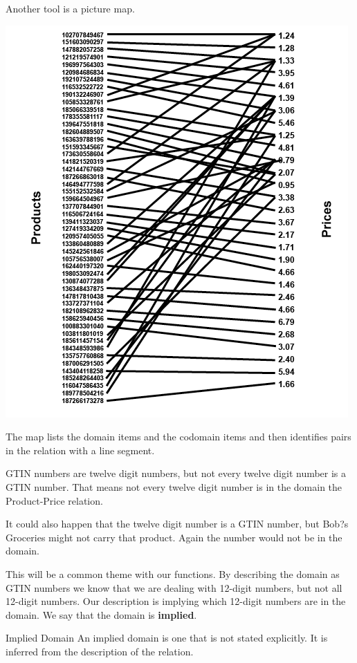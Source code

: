 \documentclass{ximera}
\begin{document}
Another tool is a picture map.
\begin{image}
\includegraphics{pics/Product_Price_Map.png}
\end{image}

The map lists the domain items and the codomain items and then identifies pairs in the relation with a line segment.



GTIN numbers are twelve digit numbers, but not every twelve digit number is a GTIN number. That means not every twelve digit number is in the domain the Product-Price relation.

It could also happen that the twelve digit number is a GTIN number, but Bob?s Groceries might not carry that product.  Again the number would not be in the domain.

This will be a common theme with our functions. By describing the domain as GTIN numbers we know that we are dealing with 12-digit numbers, but not all 12-digit numbers. Our description is implying which 12-digit numbers are in the domain.  We say that the domain is \textbf{implied}.

\begin{definition} Implied Domain
An implied domain is one that is not stated explicitly. It is inferred from the description of the relation.
\end{definition}
\end{document}
